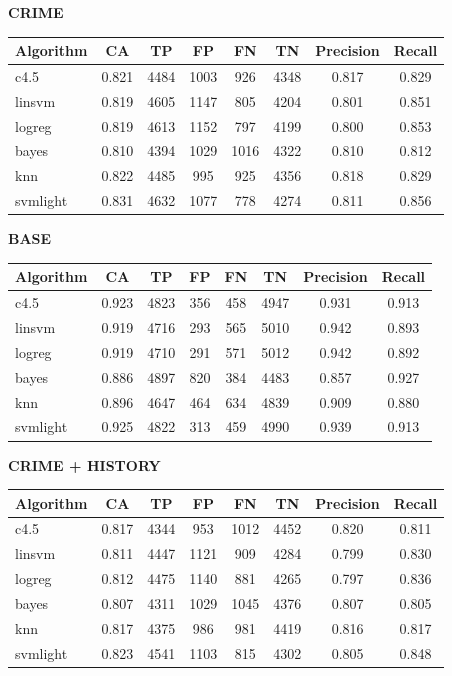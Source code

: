 \documentclass[11pt,letter]{article}
\begin{document}
\textbf{CRIME} \\
\begin{tabular}{|l|c|c|c|c|c|c|c|}
\hline
Algorithm & CA & TP & FP & FN & TN & Precision & Recall\\
\hline
c4.5     & 0.821  &  4484  &  1003  &  926   &  4348 & 0.817 & 0.829\\
linsvm   & 0.819  &  4605  &  1147  &  805   &  4204 & 0.801 & 0.851\\
logreg   & 0.819  &  4613  &  1152  &  797   &  4199 & 0.800 & 0.853\\
bayes    & 0.810  &  4394  &  1029  &  1016  &  4322 & 0.810 & 0.812\\
knn   & 0.822  &  4485  &  995   &  925   &  4356 & 0.818 & 0.829\\
svmlight & 0.831  &  4632  &  1077  &  778   &  4274 & 0.811 & 0.856\\
\hline
\end{tabular}

\textbf{BASE} \\
\begin{tabular}{|l|c|c|c|c|c|c|c|}
\hline
Algorithm & CA & TP & FP & FN & TN & Precision & Recall\\
\hline
c4.5     & 0.923 & 4823 & 356  &  458   &  4947 & 0.931 & 0.913\\ 
linsvm   & 0.919 & 4716 & 293  &  565   &  5010 & 0.942 & 0.893\\ 
logreg   & 0.919 & 4710 & 291  &  571   &  5012 & 0.942 & 0.892\\ 
bayes    & 0.886 & 4897 & 820  &  384   &  4483 & 0.857 & 0.927\\
knn   & 0.896 & 4647 & 464  &  634   &  4839 & 0.909 & 0.880\\
svmlight & 0.925 & 4822 & 313  &  459   &  4990 & 0.939 & 0.913\\
\hline
\end{tabular}

\textbf{CRIME + HISTORY} \\
\begin{tabular}{|l|c|c|c|c|c|c|c|}
\hline
Algorithm & CA & TP & FP & FN & TN & Precision & Recall\\
\hline
c4.5     & 0.817 & 4344  & 953   & 1012 &  4452 & 0.820 & 0.811\\ 
linsvm   & 0.811 & 4447  & 1121  & 909  &  4284 & 0.799 & 0.830\\
logreg   & 0.812 & 4475  & 1140  & 881  &  4265 & 0.797 & 0.836\\ 
bayes    & 0.807 & 4311  & 1029  & 1045 &  4376 & 0.807 & 0.805\\ 
knn   & 0.817 & 4375  & 986   & 981  &  4419 & 0.816 & 0.817\\ 
svmlight & 0.823 & 4541  & 1103  & 815  &  4302 & 0.805 & 0.848\\
\hline
\end{tabular}
\end{document}
